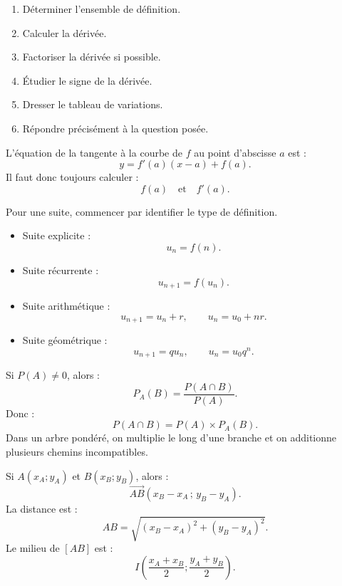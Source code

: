\documentclass[11pt,a4paper]{article}
\begin{document}
\begin{methode}
\begin{enumerate}
  \item Déterminer l'ensemble de définition.
  \item Calculer la dérivée.
  \item Factoriser la dérivée si possible.
  \item Étudier le signe de la dérivée.
  \item Dresser le tableau de variations.
  \item Répondre précisément à la question posée.
\end{enumerate}
\end{methode}

\begin{methode}
L'équation de la tangente à la courbe de $f$ au point d'abscisse $a$ est :
\[
y=f'(a)(x-a)+f(a).
\]
Il faut donc toujours calculer :
\[
f(a)\quad\text{et}\quad f'(a).
\]
\end{methode}

\begin{methode}[suites]
Pour une suite, commencer par identifier le type de définition.
\begin{itemize}
  \item Suite explicite :
  \[
  u_n=f(n).
  \]
  \item Suite récurrente :
  \[
  u_{n+1}=f(u_n).
  \]
  \item Suite arithmétique :
  \[
  u_{n+1}=u_n+r,
  \qquad
  u_n=u_0+nr.
  \]
  \item Suite géométrique :
  \[
  u_{n+1}=qu_n,
  \qquad
  u_n=u_0q^n.
  \]
\end{itemize}
\end{methode}

\begin{methode}
Si $P(A)\neq0$, alors :
\[
P_A(B)=\frac{P(A\cap B)}{P(A)}.
\]
Donc :
\[
P(A\cap B)=P(A)\times P_A(B).
\]
Dans un arbre pondéré, on multiplie le long d'une branche et on additionne plusieurs chemins incompatibles.
\end{methode}

\begin{methode}
Si $A(x_A;y_A)$ et $B(x_B;y_B)$, alors :
\[
\overrightarrow{AB}(x_B-x_A\,;\,y_B-y_A).
\]
La distance est :
\[
AB=\sqrt{(x_B-x_A)^2+(y_B-y_A)^2}.
\]
Le milieu de $[AB]$ est :
\[
I\left(\frac{x_A+x_B}{2};\frac{y_A+y_B}{2}\right).
\]
\end{methode}
\end{document}
